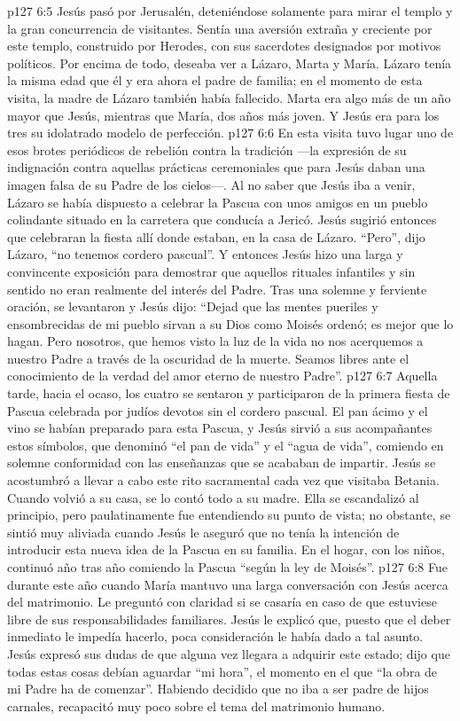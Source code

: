 \vs p127 6:5 Jesús pasó por Jerusalén, deteniéndose solamente para mirar el templo y la gran concurrencia de visitantes. Sentía una aversión extraña y creciente por este templo, construido por Herodes, con sus sacerdotes designados por motivos políticos. Por encima de todo, deseaba ver a Lázaro, Marta y María. Lázaro tenía la misma edad que él y era ahora el padre de familia; en el momento de esta visita, la madre de Lázaro también había fallecido. Marta era algo más de un año mayor que Jesús, mientras que María, dos años más joven. Y Jesús era para los tres su idolatrado modelo de perfección.
\vs p127 6:6 En esta visita tuvo lugar uno de esos brotes periódicos de rebelión contra la tradición ---la expresión de su indignación contra aquellas prácticas ceremoniales que para Jesús daban una imagen falsa de su Padre de los cielos---. Al no saber que Jesús iba a venir, Lázaro se había dispuesto a celebrar la Pascua con unos amigos en un pueblo colindante situado en la carretera que conducía a Jericó. Jesús sugirió entonces que celebraran la fiesta allí donde estaban, en la casa de Lázaro. “Pero”, dijo Lázaro, “no tenemos cordero pascual”. Y entonces Jesús hizo una larga y convincente exposición para demostrar que aquellos rituales infantiles y sin sentido no eran realmente del interés del Padre. Tras una solemne y ferviente oración, se levantaron y Jesús dijo: “Dejad que las mentes pueriles y ensombrecidas de mi pueblo sirvan a su Dios como Moisés ordenó; es mejor que lo hagan. Pero nosotros, que hemos visto la luz de la vida no nos acerquemos a nuestro Padre a través de la oscuridad de la muerte. Seamos libres ante el conocimiento de la verdad del amor eterno de nuestro Padre”.
\vs p127 6:7 Aquella tarde, hacia el ocaso, los cuatro se sentaron y participaron de la primera fiesta de Pascua celebrada por judíos devotos sin el cordero pascual. El pan ácimo y el vino se habían preparado para esta Pascua, y Jesús sirvió a sus acompañantes estos símbolos, que denominó “el pan de vida” y el “agua de vida”, comiendo en solemne conformidad con las enseñanzas que se acababan de impartir. Jesús se acostumbró a llevar a cabo este rito sacramental cada vez que visitaba Betania. Cuando volvió a su casa, se lo contó todo a su madre. Ella se escandalizó al principio, pero paulatinamente fue entendiendo su punto de vista; no obstante, se sintió muy aliviada cuando Jesús le aseguró que no tenía la intención de introducir esta nueva idea de la Pascua en su familia. En el hogar, con los niños, continuó año tras año comiendo la Pascua “según la ley de Moisés”.
\vs p127 6:8 \pc Fue durante este año cuando María mantuvo una larga conversación con Jesús acerca del matrimonio. Le preguntó con claridad si se casaría en caso de que estuviese libre de sus responsabilidades familiares. Jesús le explicó que, puesto que el deber inmediato le impedía hacerlo, poca consideración le había dado a tal asunto. Jesús expresó sus dudas de que alguna vez llegara a adquirir este estado; dijo que todas estas cosas debían aguardar “mi hora”, el momento en el que “la obra de mi Padre ha de comenzar”. Habiendo decidido que no iba a ser padre de hijos carnales, recapacitó muy poco sobre el tema del matrimonio humano.
